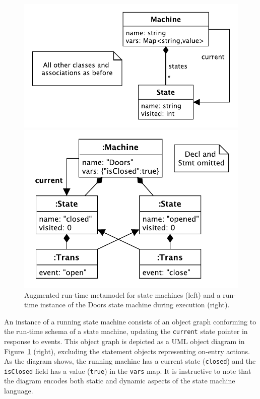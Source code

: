 \documentclass[english,crc]{programming}
\begin{document}
\begin{figure}[t]
\vspace{-0.5em}
\centering
\begin{minipage}{0.5\textwidth}
\includegraphics[width=\textwidth]{figures/runtime-model.pdf}
\end{minipage}
\hspace*{2pt}
\vline
\begin{minipage}{0.4\textwidth}
\includegraphics[width=\textwidth]{figures/doorsmachine.pdf}
\end{minipage}
\caption{Augmented run-time metamodel for state machines (left) and a run-time instance
of the Doors state machine during execution (right).}
\label{FIG:doorsRuntime}
\vspace{-0.5em}
\end{figure}

An instance of a running state machine consists of an object graph conforming to the run-time
schema of a state machine, updating the \lstinline{current} state pointer in response to events.
This object graph is depicted as a UML object diagram in Figure~\ref{FIG:doorsRuntime} (right),
excluding the statement objects representing on-entry actions. As the diagram shows, the running
machine has a current state (\lstinline{closed}) and the \lstinline{isClosed} field has a
value (\lstinline{true}) in the \lstinline{vars} map. It is instructive to note that the
diagram encodes both static and dynamic aspects of the state machine language.
\end{document}
